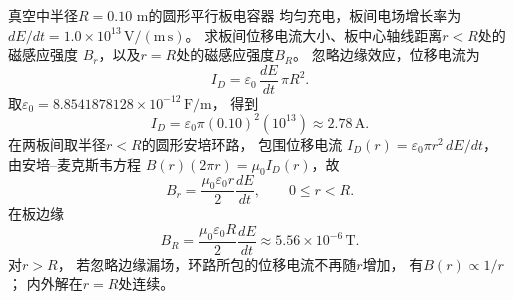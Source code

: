 \problemtext 真空中半径$R=0.10$ m的圆形平行板电容器
均匀充电，板间电场增长率为
$dE/dt=1.0\times10^{13}\,\mathrm{V/(m\,s)}$。
求板间位移电流大小、板中心轴线距离$r<R$处的磁感应强度
$B_r$，以及$r=R$处的磁感应强度$B_R$。
\workings
忽略边缘效应，位移电流为
\[
I_D=\varepsilon_0\,\frac{dE}{dt}\,\pi R^2.
\]
取$\varepsilon_0=8.8541878128\times10^{-12}\,\mathrm{F/m}$，
得到
\[
\boxed{I_D=
\varepsilon_0\pi(0.10)^2(10^{13})
\approx2.78\,\mathrm A}.
\]
在两板间取半径$r<R$的圆形安培环路，
包围位移电流
$I_D(r)=\varepsilon_0\pi r^2\,dE/dt$，
由安培--麦克斯韦方程
$B(r)(2\pi r)=\mu_0I_D(r)$，故
\[
\boxed{B_r=\frac{\mu_0\varepsilon_0r}{2}
\frac{dE}{dt}},\qquad 0\le r<R.
\]
在板边缘
\[
\boxed{B_R=\frac{\mu_0\varepsilon_0R}{2}
\frac{dE}{dt}
\approx5.56\times10^{-6}\,\mathrm T}.
\]
\crosscheck 对$r>R$，
若忽略边缘漏场，环路所包的位移电流不再随$r$增加，
有$B(r)\propto1/r$；
内外解在$r=R$处连续。
